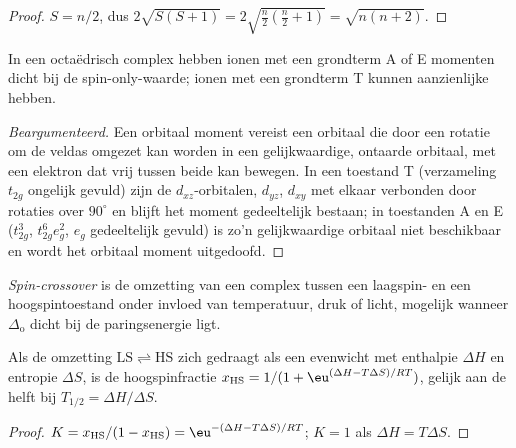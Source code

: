 \begin{proof}
$S = n/2$, dus $2\sqrt{S(S+1)} = 2\sqrt{\frac n2(\frac n2 + 1)} = \sqrt{n(n+2)}$.
\end{proof}

\begin{proposition}\label{prop:b3:complex-spectra-magnetism:orbital-contribution}
In een octaëdrisch complex hebben ionen met een grondterm A of E momenten
dicht bij de spin-only-waarde; ionen met een grondterm T kunnen
aanzienlijke  hebben.
\end{proposition}

\begin{proof}[Beargumenteerd]
Een orbitaal moment vereist een orbitaal die door een rotatie om de
veldas omgezet kan worden in een gelijkwaardige, ontaarde orbitaal,
met een elektron dat vrij tussen beide kan
bewegen. In een toestand T (verzameling $t_{2g}$ ongelijk gevuld) zijn de $d_{xz}$-orbitalen, $d_{yz}$, $d_{xy}$
met elkaar verbonden door rotaties over $90^\circ$ en blijft het moment gedeeltelijk bestaan; in toestanden A en E
($t_{2g}^3$, $t_{2g}^6e_g^2$, $e_g$ gedeeltelijk gevuld) is zo'n gelijkwaardige orbitaal niet beschikbaar en
wordt het orbitaal moment uitgedoofd.
\end{proof}

\begin{definition}\label{def:b3:complex-spectra-magnetism:spin-crossover}
\emph{Spin-crossover} is de omzetting van een complex
tussen een laagspin- en een hoogspintoestand onder invloed van temperatuur,
druk of licht, mogelijk
wanneer $\Delta_{\mathrm o}$ dicht bij de paringsenergie ligt.
\end{definition}

\begin{proposition}[Omslagtemperatuur]\label{prop:b3:complex-spectra-magnetism:crossover}
Als de omzetting $\mathrm{LS} \rightleftharpoons \mathrm{HS}$ zich gedraagt als een evenwicht met enthalpie $\Delta H$ en entropie $\Delta S$, is de
hoogspinfractie $x_{\mathrm{HS}} = 1/(1 + \eu^{(\Delta H - T\Delta S)/RT})$, gelijk aan de helft bij $T_{1/2} = \Delta H/\Delta S$.
\end{proposition}

\begin{proof}
$K = x_{\mathrm{HS}}/(1 - x_{\mathrm{HS}}) = \eu^{-(\Delta H - T\Delta S)/RT}$; $K = 1$ als $\Delta H = T\Delta S$.
\end{proof}

